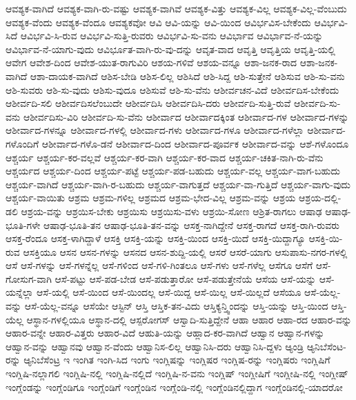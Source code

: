 {ಆವಶ್ಯಕ-ವಾಗಿದೆ
ಆವಶ್ಯಕ-ವಾಗಿ-ರು-ವಷ್ಟು
ಆವಶ್ಯಕ-ವಾಗಿವೆ
ಆವಶ್ಯಕ-ವಿತ್ತು
ಆವಶ್ಯಕ-ವಿಲ್ಲ
ಆವಶ್ಯಕ-ವಿಲ್ಲ-ವೆಂಬುದು
ಆವಶ್ಯಕ-ವೆಂದು
ಆವಶ್ಯಕ-ವೆಂದೂ
ಆವಶ್ಯಕವೋ
ಆವಿ
ಆವಿ-ಯನ್ನು
ಆವಿ-ಯಿಂದ
ಆವಿರ್ಭವಿಸ-ಬೇಕೆಂದು
ಆವಿರ್ಭವಿ-ಸಿದೆ
ಆವಿರ್ಭವಿ-ಸಿ-ರುವ
ಆವಿರ್ಭವಿ-ಸುತ್ತಿ-ರುವರು
ಆವಿರ್ಭವಿ-ಸು-ವನು
ಆವಿರ್ಭಾವ
ಆವಿರ್ಭಾವ-ನೆ-ಯನ್ನು
ಆವಿರ್ಭಾವ-ನೆ-ಯಾಗು-ವುದು
ಆವಿರ್ಭೂತ-ವಾಗಿ-ರು-ವು-ದನ್ನು
ಆವೃತ-ವಾದ
ಆವೃತ್ತಿ
ಆವೃತ್ತಿಯ
ಆವೃತ್ತಿ-ಯಲ್ಲಿ
ಆವೇಗ
ಆವೇಶ-ದಿಂದ
ಆವೇಶ-ಯುತ-ರಾಗುವಿರಿ
ಆಶಯ-ಗಳಿವೆ
ಆಶಯ-ವನ್ನೂ
ಆಶಾ-ಜನಕ-ರಾದ
ಆಶಾ-ಜನಕ-ವಾಗಿದೆ
ಆಶಾ-ದಾಯಕ-ವಾಗಿದೆ
ಆಶಿಸ-ಬೇಡಿ
ಆಶಿಸ-ಲಿಲ್ಲ
ಆಶಿಸಿದೆ
ಆಶಿ-ಸಿದ್ದ
ಆಶಿ-ಸುತ್ತೇನೆ
ಆಶಿಸುವ
ಆಶಿ-ಸು-ವನು
ಆಶಿ-ಸುವರು
ಆಶಿ-ಸು-ವುದು
ಆಶಿಸು-ವುದೂ
ಆಶಿಸುವೆ
ಆಶಿ-ಸು-ವೆನು
ಆಶೀರ್ವಚನ-ವಿದೆ
ಆಶೀರ್ವದಿಸ-ಬೇಕೆಂದು
ಆಶೀರ್ವದಿ-ಸಲಿ
ಆಶೀರ್ವದಿಸಲೆಂಬುದೇ
ಆಶೀರ್ವದಿಸಿ
ಆಶೀರ್ವದಿಸಿ-ದರು
ಆಶೀರ್ವದಿ-ಸುತ್ತಿ-ರುವೆ
ಆಶೀರ್ವದಿ-ಸು-ವನು
ಆಶೀರ್ವದಿಸು-ವಿರಿ
ಆಶೀರ್ವದಿ-ಸು-ವೆನು
ಆಶೀರ್ವಾದ
ಆಶೀರ್ವಾದಕ್ಕಿಂತ
ಆಶೀರ್ವಾದ-ಗಳ
ಆಶೀರ್ವಾದ-ಗಳನ್ನು
ಆಶೀರ್ವಾದ-ಗಳನ್ನೂ
ಆಶೀರ್ವಾದ-ಗಳಲ್ಲಿ
ಆಶೀರ್ವಾದ-ಗಳು
ಆಶೀರ್ವಾದ-ಗಳೂ
ಆಶೀರ್ವಾದ-ಗಳೆಲ್ಲಾ
ಆಶೀರ್ವಾದ-ಗಳೊಂದಿಗೆ
ಆಶೀರ್ವಾದ-ಗಳೊ-ಡನೆ
ಆಶೀರ್ವಾದ-ದಿಂದ
ಆಶೀರ್ವಾದ-ಪೂರ್ವಕ
ಆಶೀರ್ವಾದ-ವನ್ನು
ಆಶೆ-ಗಳೊಂದೂ
ಆಶ್ಚರ್ಯ
ಆಶ್ಚರ್ಯ-ಕರ-ವಲ್ಲವೆ
ಆಶ್ಚರ್ಯ-ಕರ-ವಾಗಿ
ಆಶ್ಚರ್ಯ-ಕರ-ವಾದ
ಆಶ್ಚರ್ಯ-ಚಕಿತ-ನಾಗಿ-ರು-ವೆನು
ಆಶ್ಚರ್ಯದ
ಆಶ್ಚರ್ಯ-ದಿಂದ
ಆಶ್ಚರ್ಯ-ಪಟ್ಟೆ
ಆಶ್ಚರ್ಯ-ಪಡ-ಬಹುದು
ಆಶ್ಚರ್ಯ-ವಲ್ಲ
ಆಶ್ಚರ್ಯ-ವಾಗ-ಬಹುದು
ಆಶ್ಚರ್ಯ-ವಾಗಿದೆ
ಆಶ್ಚರ್ಯ-ವಾಗಿ-ರ-ಬಹುದು
ಆಶ್ಚರ್ಯ-ವಾಗುತ್ತದೆ
ಆಶ್ಚರ್ಯ-ವಾ-ಗುತ್ತಿದೆ
ಆಶ್ಚರ್ಯ-ವಾಗು-ವುದು
ಆಶ್ಚರ್ಯ-ವಾಯಿತು
ಆಶ್ರಮ
ಆಶ್ರಮ-ಗಳಿಲ್ಲ
ಆಶ್ರಮದ
ಆಶ್ರಮ-ಭೇದ-ವಿಲ್ಲ
ಆಶ್ರಮ-ವನ್ನು
ಆಶ್ರಯ
ಆಶ್ರಯ-ದಲ್ಲಿ-ಡಲಿ
ಆಶ್ರಯ-ವನ್ನು
ಆಶ್ರಯಿಸ-ಬೇಕು
ಆಶ್ರಯಿಸು
ಆಶ್ರಯಿಸು-ವಳು
ಆಶ್ರಯಿ-ಸೋಣ
ಆಶ್ರಿತ-ರಾಗಲು
ಆಷಾಢ
ಆಷಾಢ-ಭೂತಿ-ಗಳೇ
ಆಷಾಢ-ಭೂತಿ-ತನ
ಆಷಾಢ-ಭೂತಿ-ತನ-ವನ್ನು
ಆಸಕ್ತ-ನಾಗಿದ್ದೇನೆ
ಆಸಕ್ತ-ರಾಗದೆ
ಆಸಕ್ತ-ರಾಗಿ-ರುವರು
ಆಸಕ್ತ-ರೆಂದೂ
ಆಸಕ್ತ-ಳಾಗಿದ್ದಾಳೆ
ಆಸಕ್ತಿ
ಆಸಕ್ತಿ-ಯನ್ನು
ಆಸಕ್ತಿ-ಯಿಂದ
ಆಸಕ್ತಿ-ಯಿದೆ
ಆಸಕ್ತಿ-ಯಿದ್ದಾಗ್ಯೂ
ಆಸಕ್ತಿ-ಯಿ-ರುವ
ಆಸಕ್ತಿಯೂ
ಆಸನ
ಆಸನ-ಗಳನ್ನು
ಆಸನದ
ಆಸನ-ಶುದ್ದಿ-ಯಲ್ಲಿ
ಆಸರೆ
ಆಸರೆ-ಯಾಗು
ಆಸುಪಾಸು-ನಗರ-ಗಳಲ್ಲಿ
ಆಸೆ
ಆಸೆ-ಗಳನ್ನು
ಆಸೆ-ಗಳನ್ನೆಲ್ಲ
ಆಸೆ-ಗಳಿಂದ
ಆಸೆ-ಗಳಿ-ಗಿಂತಲೂ
ಆಸೆ-ಗಳು
ಆಸೆ-ಗಳೆಲ್ಲ
ಆಸೆಗೂ
ಆಸೆಗೆ
ಆಸೆ-ಗೋಸುಗ-ವಾಗಿ
ಆಸೆ-ಪಟ್ಟು
ಆಸೆ-ಪಡ-ಬೇಡ
ಆಸೆ-ಪಡುತ್ತಾರೋ
ಆಸೆ-ಪಡುತ್ತೇನೆಯೆ
ಆಸೆಯ
ಆಸೆ-ಯನ್ನು
ಆಸೆ-ಯನ್ನೆಲ್ಲಾ
ಆಸೆ-ಯಲ್ಲಿ
ಆಸೆ-ಯಿಂದ
ಆಸೆ-ಯಿಂದಲ್ಲ
ಆಸೆ-ಯಿದ್ದ
ಆಸೆ-ಯಿಲ್ಲ
ಆಸೆ-ಯಿಲ್ಲದೆ
ಆಸೆಯೂ
ಆಸೆ-ಯೆಲ್ಲ-ವನ್ನು
ಆಸೆ-ಯೆಲ್ಲ-ವನ್ನೂ
ಆಸೆಯೇ
ಆಸ್ಟಿನ್
ಆಸ್ತಿ
ಆಸ್ತಿಕ-ತನ-ವಿದು
ಆಸ್ತಿಕ್ಯನ್ತ್ವಿಂದನ್ನು
ಆಸ್ತಿ-ಯನ್ನು
ಆಸ್ತಿ-ಯಿಂದ
ಆಸ್ತಿ-ಯೆಲ್ಲ
ಆಸ್ಥಾನ-ಗಳಲ್ಲಿಯೂ
ಆಸ್ಥಾನ-ದಲ್ಲಿ
ಆಸ್ಪರೋಗಸ್
ಆಸ್ವಾದಿ-ಸುತ್ತಿದ್ದೇನೆ
ಆಹಾ
ಆಹಾರ
ಆಹಾ-ರದ
ಆಹಾರ-ವನ್ನು
ಆಹಾರ-ವನ್ನೇ
ಆಹಾರ-ವಿತ್ತರು
ಆಹಾರ-ವಿದೆ
ಆಹುತಿ-ಯನ್ನು
ಆಹ್ಲಾದ-ಕರ-ವಾಗಿದೆ
ಆಹ್ವಾನ
ಆಹ್ವಾನ-ಗಳನ್ನು
ಆಹ್ವಾನ-ವನ್ನು
ಆಹ್ವಾನವು
ಆಹ್ವಾನ-ವೆಂದು
ಆಹ್ವಾನಿಸ-ಲಿಲ್ಲ
ಆಹ್ವಾನಿಸಿ-ದರು
ಆಹ್ವಾನಿಸಿ-ದ್ದಳು
ಆ್ಯಂಡ್ರಿ
ಆ್ಯನಿಬೆಸೆಂಟ-ರನ್ನು
ಆ್ಯನಿಬೆಸೆಂಟ್ರ
ಇ
ಇಂಗಿತ
ಇಂಗಿ-ಸಿದ
ಇಂಗು
ಇಂಗ್ಲಿಷನ್ನು
ಇಂಗ್ಲಿಷರ
ಇಂಗ್ಲಿಷ-ರನ್ನು
ಇಂಗ್ಲಿಷರು
ಇಂಗ್ಲಿಷಿಗೆ
ಇಂಗ್ಲಿಷಿ-ನಲ್ಲಾಗಲಿ
ಇಂಗ್ಲಿಷಿ-ನಲ್ಲಿ
ಇಂಗ್ಲಿಷಿ-ನಲ್ಲಿದೆ
ಇಂಗ್ಲಿಷಿ-ನ-ವನು
ಇಂಗ್ಲಿಷ್
ಇಂಗ್ಲೀಷಿಗೆ
ಇಂಗ್ಲೀಷಿ-ನಲ್ಲಿ
ಇಂಗ್ಲೀಷ್
ಇಂಗ್ಲೆಂಡನ್ನು
ಇಂಗ್ಲೆಂಡಿಗೂ
ಇಂಗ್ಲೆಂಡಿಗೆ
ಇಂಗ್ಲೆಂಡಿನ
ಇಂಗ್ಲೆಂಡಿ-ನಲ್ಲಿ
ಇಂಗ್ಲೆಂಡಿನಲ್ಲಿದ್ದಾಗ
ಇಂಗ್ಲೆಂಡಿನಲ್ಲಿ-ಯಾದರೋ
}

